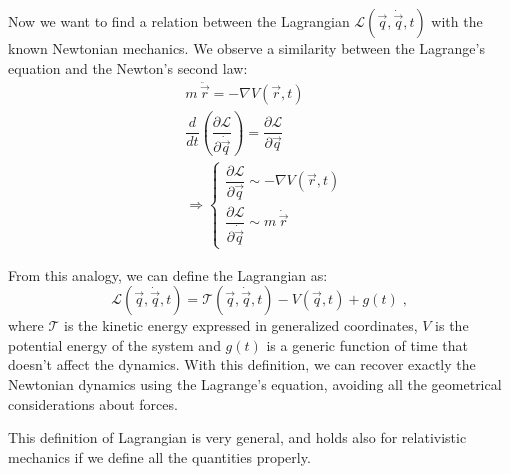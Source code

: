 \documentclass[12pt,a4paper]{article}
\begin{document}
Now we want to find a relation between the Lagrangian $\mathcal{L}(\vec{q}, \dot{\vec{q}}, t)$
with the known Newtonian mechanics. 
We observe a similarity between the Lagrange's equation and the Newton's second law:
\begin{align*}
	&m \, \ddot{\vec{r}}  = -\nabla V(\vec{r},t) \\[3pt]
	&\dfrac{d}{dt} \left( \dfrac{\partial \mathcal{L}}{\partial \dot{\vec{q}}} \right) = \dfrac{\partial \mathcal{L}}{\partial \vec{q}} \\[7pt]
	&\Rightarrow \begin{cases}
		\dfrac{\partial \mathcal{L}}{\partial \vec{q}} \sim -\nabla V(\vec{r},t) \\[12pt]
		\dfrac{\partial \mathcal{L}}{\partial \dot{\vec{q}}} \sim m \, \dot{\vec{r}}
	\end{cases}
\end{align*}

From this analogy, we can define the Lagrangian as:
\begin{equation}
	\mathcal{L}(\vec{q}, \dot{\vec{q}}, t) = \mathcal{T}(\vec{q}, \dot{\vec{q}}, t) - V(\vec{q}, t) + g(t)\;,
\end{equation}
where $\mathcal{T}$ is the kinetic energy expressed in generalized coordinates, $V$ is the
potential energy of the system and $g(t)$ is a generic function of time that doesn't affect the
dynamics.
With this definition, we can recover exactly the Newtonian dynamics using the Lagrange's equation,
avoiding all the geometrical considerations about forces.

This definition of Lagrangian is very general, and holds also for relativistic mechanics if we
define all the quantities properly.
\end{document}
